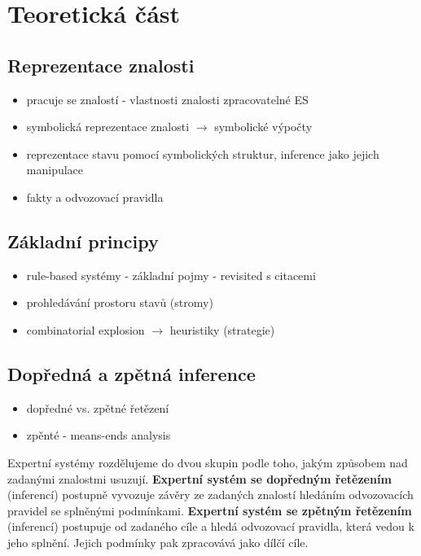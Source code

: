 \section{Teoretická část}


\subsection{Reprezentace znalosti}
\begin{framed}
  \begin{itemize}
    \item pracuje se znalostí - vlastnosti znalosti zpracovatelné ES
    \item symbolická reprezentace znalosti $\rightarrow$ symbolické výpočty
    \item reprezentace stavu pomocí symbolických struktur, inference jako jejich manipulace
    \item fakty a odvozovací pravidla
  \end{itemize}
\end{framed}

\subsection{Základní principy}
\begin{framed}
  \begin{itemize}
    \item rule-based systémy - základní pojmy - revisited s citacemi
    \item prohledávání prostoru stavů (stromy)
    \item combinatorial explosion $\rightarrow$ heuristiky (strategie)
  \end{itemize}
\end{framed}

\subsection{Dopředná a zpětná inference}
\begin{framed}
  \begin{itemize}
    \item dopředné vs. zpětné řetězení
    \item zpěnté - means-ends analysis
  \end{itemize}
\end{framed}

Expertní systémy rozdělujeme do dvou skupin podle toho, jakým způsobem nad
zadanými znalostmi usuzují. \textbf{Expertní systém se dopředným řetězením}
(inferencí) postupně vyvozuje závěry ze zadaných znalostí hledáním odvozovacích
pravidel se splněnými podmínkami. \textbf{Expertní systém se zpětným řetězením}
(inferencí) postupuje od zadaného cíle a hledá odvozovací pravidla, která vedou
k jeho splnění. Jejich podmínky pak zpracovává jako dílčí cíle.

